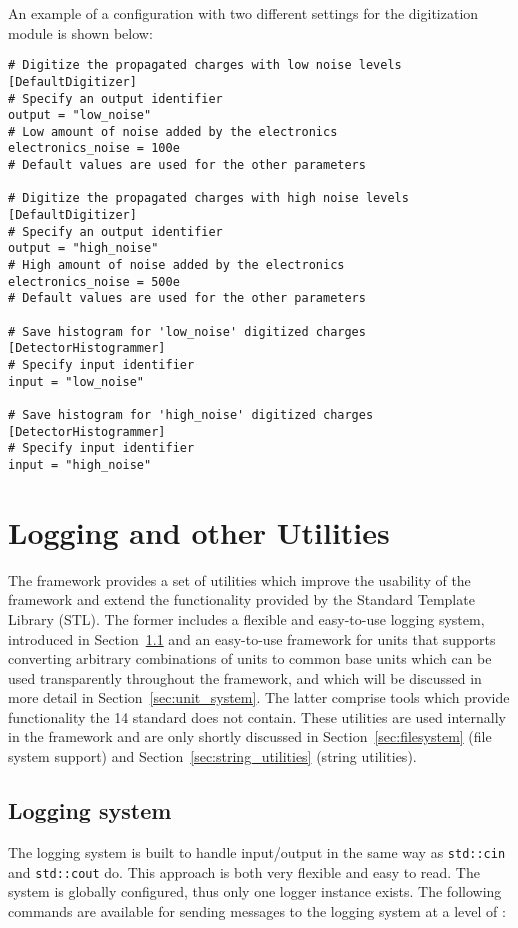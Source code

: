 An example of a configuration with two different settings for the digitization module is shown below:
\begin{verbatim}
# Digitize the propagated charges with low noise levels
[DefaultDigitizer]
# Specify an output identifier
output = "low_noise"
# Low amount of noise added by the electronics
electronics_noise = 100e
# Default values are used for the other parameters

# Digitize the propagated charges with high noise levels
[DefaultDigitizer]
# Specify an output identifier
output = "high_noise"
# High amount of noise added by the electronics
electronics_noise = 500e
# Default values are used for the other parameters

# Save histogram for 'low_noise' digitized charges
[DetectorHistogrammer]
# Specify input identifier
input = "low_noise"

# Save histogram for 'high_noise' digitized charges
[DetectorHistogrammer]
# Specify input identifier
input = "high_noise"
\end{verbatim}


\section{Logging and other Utilities}
\label{sec:logging_utilities}
The \apsq framework provides a set of utilities which improve the usability of the framework and extend the functionality provided by the \CPP Standard Template Library (STL).
The former includes a flexible and easy-to-use logging system, introduced in Section~\ref{sec:logger} and an easy-to-use framework for units that supports converting arbitrary combinations of units to common base units which can  be used transparently throughout the framework, and which will be discussed in more detail in Section~\ref{sec:unit_system}.
The latter comprise tools which provide functionality the {\CPP}14 standard does not contain.
These utilities are used internally in the framework and are only shortly discussed in Section~\ref{sec:filesystem} (file system support) and Section~\ref{sec:string_utilities} (string utilities).

\subsection{Logging system}
\label{sec:logger}
The logging system is built to handle input/output in the same way as \texttt{std::cin} and \texttt{std::cout} do.
This approach is both very flexible and easy to read.
The system is globally configured, thus only one logger instance exists.
The following commands are available for sending messages to the logging system at a level of :

